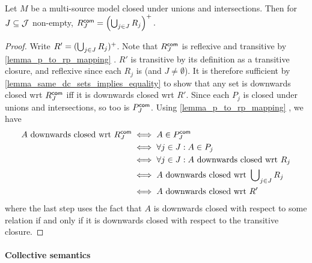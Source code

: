 \begin{proposition}
\label{prop_rcommon}
Let $M$ be a multi-source model closed under unions and intersections.
Then for $J \subseteq \mathcal{J}$ non-empty,
$
R^{\mathsf{com}}_J = \left(
  \bigcup\nolimits_{j \in J}{R_j}
\right)^{+}.$
\end{proposition}
\begin{proof}

    Write $R' = (\bigcup_{j \in J}{R_j})^{+}$. Note that $R^{\mathsf{com}}_J$ is
    reflexive and transitive by \cref{lemma_p_to_rp_mapping}
    . $R'$ is transitive by its definition as a
    transitive closure, and reflexive since each $R_j$ is (and $J \ne
    \emptyset$).
    It is therefore sufficient by
\cref{lemma_same_dc_sets_implies_equality} to show that any set
is downwards closed wrt $R^{\mathsf{com}}_J$ iff it is
downwards closed wrt $R'$. Since each $P_j$ is closed under
unions and intersections, so too is $P^{\mathsf{com}}_J$. Using
\cref{lemma_p_to_rp_mapping} , we have
\[
\begin{aligned}
   A \text{ downwards closed wrt } R^{\mathsf{com}}_J
   &\iff A \in P^{\mathsf{com}}_J \\
   &\iff \forall j \in J: A \in P_j \\
   &\iff \forall j \in J: A \text{ downwards closed wrt } R_j \\
   &\iff A \text{ downwards closed wrt } \bigcup\nolimits_{j \in J}{R_j} \\
   &\iff A \text{ downwards closed wrt } R'
\end{aligned}\]
where the last step uses the fact that $A$ is downwards closed with respect to
some relation if and only if it is downwards closed with respect to the
transitive closure. %

\end{proof}

\paragraph{Collective semantics}

